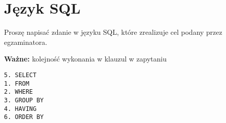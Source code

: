 \section{Język SQL}
\label{sec:jezyk_sql}

\horrule{0.5pt}
Proszę napisać zdanie w języku SQL, które zrealizuje cel podany przez
egzaminatora.\\
\horrule{0.5pt}

\textbf{Ważne:} kolejność wykonania w klauzul w zapytaniu
\begin{verbatim}
5. SELECT
1. FROM
2. WHERE
3. GROUP BY
4. HAVING
6. ORDER BY
\end{verbatim}
